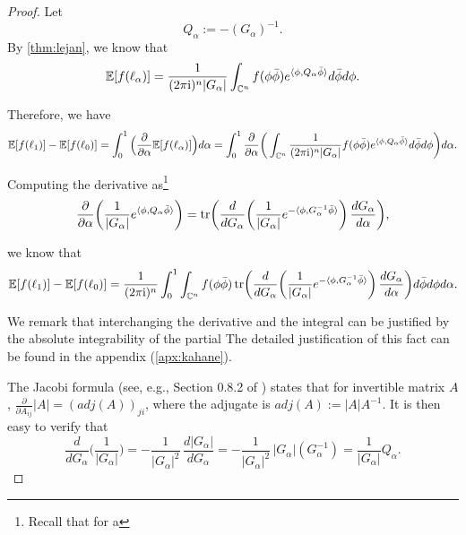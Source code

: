 \documentclass[a4paper, 11pt]{article}
\newcommand{\E}{\mathbb{E}}
\newcommand{\compi}{\textnormal{i}}
\newcommand{\tr}{\textnormal{tr}}
\begin{document}
\begin{proof}
Let
\begin{equation}        \label{eq:qalpha}
Q_{\alpha}:=-(G_{\alpha})^{-1}.
\end{equation}
By \cref{thm:lejan}, we know that
\[\E[f(\ell_\alpha)]=\frac{1}{(2\pi\compi)^n|G_\alpha|}\int_{\mathbb{C}^n}f(\phi\bar{\phi})e^{\langle \phi,Q_{\alpha}\bar{\phi}\rangle}d\bar{\phi} d\phi .\]

Therefore, we have
\[\E[f(\ell_1)]-\E[f(\ell_0)]
= \int_0^1\Big(\frac{\partial}{\partial \alpha} \E[f(\ell_\alpha)]\Big)d\alpha\\
= \int_0^1\frac{\partial}{\partial \alpha}\bigg(\int_{\mathbb{C}^n}\frac{1}{(2\pi\compi)^n|G_\alpha|}f(\phi\bar{\phi})e^{\langle \phi,Q_{\alpha}\bar{\phi}\rangle}d\bar{\phi} d\phi \bigg)d\alpha.\]

Computing the derivative as\footnote{Recall that for a %
 }
\[\frac{\partial}{\partial \alpha}\bigg(\frac{1}{|G_\alpha|}e^{\langle \phi,Q_{\alpha}\bar{\phi}\rangle}\bigg)=\tr\bigg(\frac{d}{d G_{\alpha}}\bigg(\frac{1}{|G_\alpha|}e^{-\langle \phi,G_\alpha^{-1}\bar{\phi}\rangle}\bigg)\, \frac{d G_\alpha}{d\alpha}\bigg),\]

we know that
\[
\E[f(\ell_1)]-\E[f(\ell_0)]
= \frac{1}{(2\pi\compi)^n}
\int_0^1\int_{\mathbb{C}^n}f(\phi\bar{\phi})\, \tr\bigg(\frac{d}{d G_{\alpha}}\bigg(\frac{1}{|G_\alpha|}e^{-\langle \phi,G_\alpha^{-1}\bar{\phi}\rangle}\bigg)\, \frac{d G_\alpha}{d\alpha}\bigg)d\bar{\phi} d\phi d\alpha.
\]

We remark that interchanging
the derivative and the integral can be justified by the absolute integrability of the partial %
The detailed justification of this fact can be found in the appendix (\cref{apx:kahane}).

The Jacobi formula (see, e.g., Section 0.8.2 of \cite{hj12}) states that for invertible matrix $A$, $\frac{\partial}{\partial A_{ij}} |A|=(adj(A))_{ji}$, where the adjugate is $adj(A):=|A|A^{-1}$. It is then easy to verify that
\[\frac{d}{d G_{\alpha}}\bigg(\frac{1}{|G_\alpha|}\bigg)
=-\frac{1}{|G_\alpha|^2}\, \frac{d|G_\alpha|}{d G_\alpha} =-\frac{1}{|G_\alpha|^2}\, |G_\alpha|(G_\alpha^{-1}) =\frac{1}{|G_\alpha|}Q_{\alpha}.\]


\end{proof}
\end{document}
